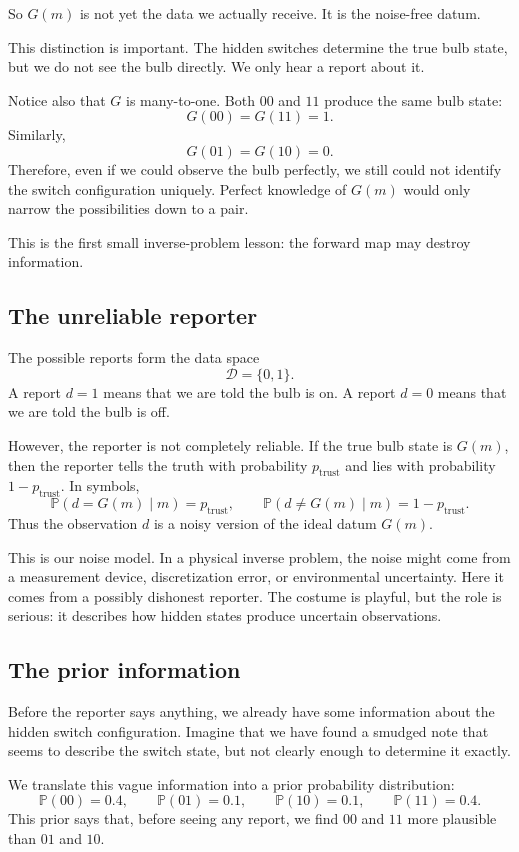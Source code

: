 \documentclass[11pt]{article}
\newcommand{\D}{\mathcal{D}}
\newcommand{\ptrust}{p_{\mathrm{trust}}}
\begin{document}
So \(G(m)\) is not yet the data we actually receive. It is the noise-free datum.

This distinction is important. The hidden switches determine the true bulb state, but we do not see the bulb directly. We only hear a report about it.

Notice also that \(G\) is many-to-one. Both \(00\) and \(11\) produce the same bulb state:
\[
    G(00)=G(11)=1.
\]
Similarly,
\[
    G(01)=G(10)=0.
\]
Therefore, even if we could observe the bulb perfectly, we still could not identify the switch configuration uniquely. Perfect knowledge of \(G(m)\) would only narrow the possibilities down to a pair.

This is the first small inverse-problem lesson: the forward map may destroy information.

\subsection{The unreliable reporter}

The possible reports form the data space
\[
    \D=\{0,1\}.
\]
A report \(d=1\) means that we are told the bulb is on. A report \(d=0\) means that we are told the bulb is off.

However, the reporter is not completely reliable. If the true bulb state is \(G(m)\), then the reporter tells the truth with probability \(\ptrust\) and lies with probability \(1-\ptrust\). In symbols,
\[
    \mathbb{P}(d=G(m)\mid m)=\ptrust,
    \qquad
    \mathbb{P}(d\neq G(m)\mid m)=1-\ptrust.
\]
Thus the observation \(d\) is a noisy version of the ideal datum \(G(m)\).

This is our noise model. In a physical inverse problem, the noise might come from a measurement device, discretization error, or environmental uncertainty. Here it comes from a possibly dishonest reporter. The costume is playful, but the role is serious: it describes how hidden states produce uncertain observations.

\subsection{The prior information}

Before the reporter says anything, we already have some information about the hidden switch configuration. Imagine that we have found a smudged note that seems to describe the switch state, but not clearly enough to determine it exactly.

We translate this vague information into a prior probability distribution:
\[
    \mathbb{P}(00)=0.4,
    \qquad
    \mathbb{P}(01)=0.1,
    \qquad
    \mathbb{P}(10)=0.1,
    \qquad
    \mathbb{P}(11)=0.4.
\]
This prior says that, before seeing any report, we find \(00\) and \(11\) more plausible than \(01\) and \(10\).
\end{document}
